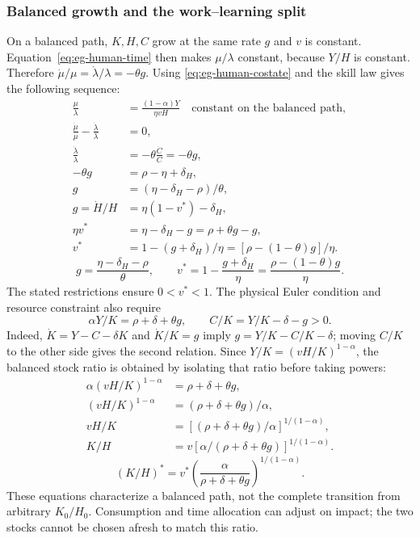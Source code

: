 \subsubsection{Balanced growth and the work--learning split}

On a balanced path, $K,H,C$ grow at the same rate $g$ and $v$ is constant.
Equation~\eqref{eq:eg-human-time} then makes $\mu/\lambda$ constant, because
$Y/H$ is constant. Therefore $\dot\mu/\mu=\dot\lambda/\lambda=-\theta g$.
Using \eqref{eq:eg-human-costate} and the skill law gives
the following sequence:
\begin{align}
\frac{\mu}{\lambda}&=\frac{(1-\alpha)Y}{\eta vH}
                     \quad\text{constant on the balanced path},\\
\frac{\dot\mu}{\mu}-\frac{\dot\lambda}{\lambda}&=0,\\
\frac{\dot\lambda}{\lambda}
 &=-\theta\frac{\dot C}{C}=-\theta g,\\
-\theta g&=\rho-\eta+\delta_H,\\
g&=(\eta-\delta_H-\rho)/\theta,\\
g=\dot H/H&=\eta(1-v^*)-\delta_H,\\
\eta v^*&=\eta-\delta_H-g
          =\rho+\theta g-g,\\
v^*&=1-(g+\delta_H)/\eta
    =[\rho-(1-\theta)g]/\eta.
\end{align}
\begin{equation}\label{eq:eg-human-growth}
g=\frac{\eta-\delta_H-\rho}{\theta},\qquad
v^*=1-\frac{g+\delta_H}{\eta}
=\frac{\rho-(1-\theta)g}{\eta}.
\end{equation}
The stated restrictions ensure $0<v^*<1$. The physical Euler condition and
resource constraint also require
\begin{equation}
\alpha Y/K=\rho+\delta+\theta g,\qquad
C/K=Y/K-\delta-g>0.
\end{equation}
Indeed, $\dot K=Y-C-\delta K$ and $\dot K/K=g$ imply
$g=Y/K-C/K-\delta$; moving $C/K$ to the other side gives the second relation.
Since $Y/K=(vH/K)^{1-\alpha}$, the balanced stock ratio is
obtained by isolating that ratio before taking powers:
\begin{align}
\alpha(vH/K)^{1-\alpha}&=\rho+\delta+\theta g,\\
(vH/K)^{1-\alpha}&=(\rho+\delta+\theta g)/\alpha,\\
vH/K&=[(\rho+\delta+\theta g)/\alpha]^{1/(1-\alpha)},\\
K/H&=v[\alpha/(\rho+\delta+\theta g)]^{1/(1-\alpha)}.
\end{align}
\begin{equation}
(K/H)^*=v^*\left(\frac{\alpha}{\rho+\delta+\theta g}\right)^{1/(1-\alpha)}.
\end{equation}
These equations characterize a balanced path, not the complete transition
from arbitrary $K_0/H_0$. Consumption and time allocation can adjust on impact;
the two stocks cannot be chosen afresh to match this ratio.


